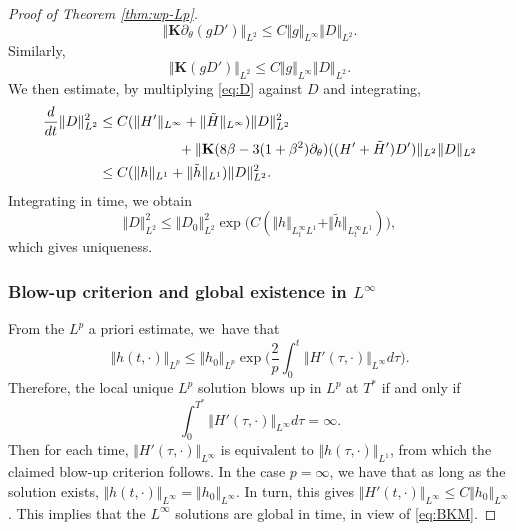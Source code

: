 \documentclass[JEP,XML,SOM,Unicode,NoFloatCountersInSection,published]{cedram}
\theoremstyle{plain}
\theoremstyle{definition}
\newcommand{\nrm}[1]{\Vert#1\Vert}
\let\rd\partial
\let\bt\beta
\let\tht\theta
\newcommand{\bfK}{{\mathbf K}}
\begin{document}
\begin{proof}[Proof of Theorem \ref{thm:wp-Lp}]
\begin{equation*}
\nrm{ \bfK\rd_\tht (g D') }_{L^2} \le C\nrm{g}_{L^\infty} \nrm{D}_{L^2}.
\end{equation*}
Similarly,
\begin{equation*}
\nrm{ \bfK (g D') }_{L^2} \le C\nrm{g}_{L^\infty} \nrm{D}_{L^2}.
\end{equation*}
We then estimate, by multiplying \eqref{eq:D} against $D$ and integrating,
\begin{equation*}
\begin{split}
\frac{d}{dt} \nrm{D}_{L^2}^2 &\le C(\nrm{H'}_{L^\infty} + \nrm{\tilde{H}}_{L^\infty}) \nrm{D}_{L^2}^2\\
&\hspace*{2cm}+ \nrm{ \bfK(8\bt -3(1+\bt^2)\rd_\tht) ((H'+ \tilde{H}')D') }_{L^2} \nrm{D}_{L^2} \\
& \le C(\nrm{h}_{L^1} + \nrm{\tilde{h}}_{L^1}) \nrm{D}_{L^2}^2.
\end{split}
\end{equation*}
Integrating in time, we obtain
\begin{equation*}
\nrm{D}_{L^2}^2 \le \nrm{D_0}_{L^2}^2 \exp\bigl(C(\nrm{h}_{L^\infty_t L^1} + \nrm{\tilde{h}}_{L^\infty_t L^1}) \bigr),
\end{equation*}
which gives uniqueness.

\subsubsection{Blow-up criterion and global existence in $L^\infty$}
From the $L^p$ a priori estimate, we~have that
\begin{equation*}
\nrm{h(t,\cdot)}_{L^p} \le \nrm{h_0}_{L^p} \exp\biggl(\frac{2}{p} \int_0^t \nrm{H'(\tau,\cdot)}_{L^\infty} d\tau \biggr).
\end{equation*}
Therefore, the local unique $L^p$ solution blows up in $L^p$ at $T^*$ if and only if
\begin{equation}\label{eq:BKM}
\int_0^{T^*}\nrm{H'(\tau,\cdot)}_{L^\infty} d\tau=\infty.
\end{equation}
Then for each time, $\nrm{H'(\tau,\cdot)}_{L^\infty}$ is equivalent to $\nrm{h(\tau,\cdot)}_{L^1}$, from which the claimed blow-up criterion follows. In the case $p=\infty$, we have that as long as the solution exists, $\nrm{h(t,\cdot)}_{L^\infty} = \nrm{h_0}_{L^\infty}$. In turn, this gives $\nrm{H'(t,\cdot)}_{L^\infty} \le C\nrm{h_0}_{L^\infty}$. This implies that the $L^\infty$ solutions are global in time, in view of \eqref{eq:BKM}.
\end{proof}
\end{document}
